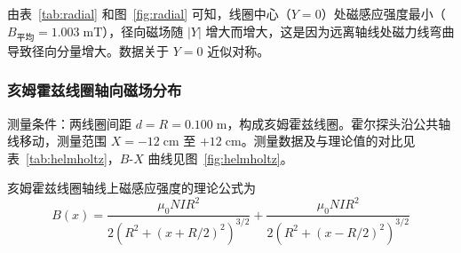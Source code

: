 \documentclass{Phyport}
\begin{document}
由表~\ref{tab:radial} 和图~\ref{fig:radial} 可知，线圈中心（$Y = 0$）处磁感应强度最小（$B_{\text{平均}} = 1.003\;\text{mT}$），径向磁场随 $|Y|$ 增大而增大，这是因为远离轴线处磁力线弯曲导致径向分量增大。数据关于 $Y = 0$ 近似对称。

\subsubsection{亥姆霍兹线圈轴向磁场分布}

测量条件：两线圈间距 $d = R = 0.100\;\text{m}$，构成亥姆霍兹线圈。霍尔探头沿公共轴线移动，测量范围 $X = -12\;\text{cm}$ 至 $+12\;\text{cm}$。测量数据及与理论值的对比见表~\ref{tab:helmholtz}，$B$-$X$ 曲线见图~\ref{fig:helmholtz}。

亥姆霍兹线圈轴线上磁感应强度的理论公式为
\begin{equation}
    B(x) = \frac{\mu_0 N I R^2}{2(R^2 + (x + R/2)^2)^{3/2}} + \frac{\mu_0 N I R^2}{2(R^2 + (x - R/2)^2)^{3/2}}
    \label{eq:helmholtz}
\end{equation}
\end{document}

